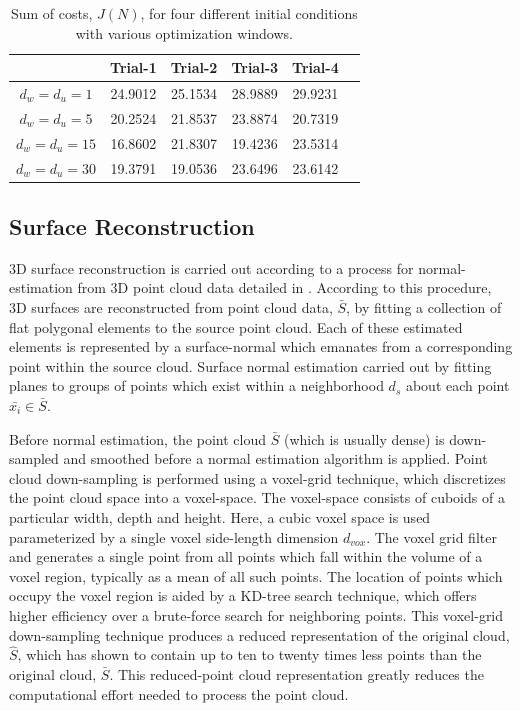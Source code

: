 				\begin{table}[h]
					\centering
					\begin{tabularx}{\textwidth}{|C{0.25}||C{0.15}|C{0.15}|C{0.15}|C{0.15}|C{0.15}|}\hline
									& 	Trial-1		&	Trial-2 &	Trial-3 &	Trial-4 \\ \hline \hline
						$d_{w}=d_{u}=1$ 	&	24.9012		& 	25.1534	& 	28.9889	& 	29.9231	\\ \hline
						$d_{w}=d_{u}=5$ 	&	20.2524		& 	21.8537	& 	23.8874	& 	20.7319	\\ \hline
						$d_{w}=d_{u}=15$ 	&	16.8602		& 	21.8307	& 	19.4236	& 	23.5314	\\ \hline
						$d_{w}=d_{u}=30$ 	&	19.3791		& 	19.0536	& 	23.6496	& 	23.6142	\\ \hline
					\end{tabularx}
					\caption{Sum of costs, $J(N)$, for four different initial conditions with various optimization windows.}
					\label{tab::DefaultStance}
				\end{table}		


		\subsection{Surface Reconstruction}

			3D surface reconstruction is carried out according to a process for normal-estimation from 3D point cloud data detailed in \cite{Rusu2009}. According to this procedure, 3D surfaces are reconstructed from point cloud data, $\bar{S}$, by fitting a collection of flat polygonal elements to the source point cloud. Each of these estimated elements is represented by a surface-normal which emanates from a corresponding point within the source cloud. Surface normal estimation carried out by fitting planes to groups of points which exist within a neighborhood $d_{s}$ about each point $\bar{x_{i}}\in\bar{S}$.

			Before normal estimation, the point cloud $\bar{S}$ (which is usually dense) is down-sampled and smoothed before a normal estimation algorithm is applied. Point cloud down-sampling is performed using a voxel-grid technique, which discretizes the point cloud space into a voxel-space. The voxel-space consists of cuboids of a particular width, depth and height. Here, a cubic voxel space is used parameterized by a single voxel side-length dimension $d_{vox}$. The voxel grid filter and generates a single point from all points which fall within the volume of a voxel region, typically as a mean of all such points. The location of points which occupy the voxel region is aided by a KD-tree search technique, which offers higher efficiency over a brute-force search for neighboring points. This voxel-grid down-sampling technique produces a reduced representation of the original cloud, $\hat{S}$, which has shown to contain up to ten to twenty times less points than the original cloud, $\bar{S}$. This reduced-point cloud representation greatly reduces the computational effort needed to process the point cloud.
			
